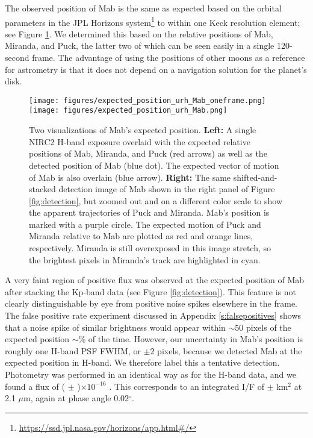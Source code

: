 \documentclass[preprint]{aastex631}
\begin{document}
The observed position of Mab is the same as expected based on the orbital parameters in the JPL Horizons system\footnote{\url{https://ssd.jpl.nasa.gov/horizons/app.html\#/}} to within one Keck resolution element; see Figure \ref{fig:astrometry}. We determined this based on the relative positions of Mab, Miranda, and Puck, the latter two of which can be seen easily in a single 120-second frame. The advantage of using the positions of other moons as a reference for astrometry is that it does not depend on a navigation solution for the planet's disk.

\begin{figure}
\texttt{[image: figures/expected\_position\_urh\_Mab\_oneframe.png]}
\texttt{[image: figures/expected\_position\_urh\_Mab.png]}
\caption{Two visualizations of Mab's expected position. \textbf{Left:} A single NIRC2 H-band exposure overlaid with the expected relative positions of Mab, Miranda, and Puck (red arrows) as well as the detected position of Mab (blue dot). The expected vector of motion of Mab is also overlain (blue arrow). \textbf{Right:} The same shifted-and-stacked detection image of Mab shown in the right panel of Figure \ref{fig:detection}, but zoomed out and on a different color scale to show the apparent trajectories of Puck and Miranda. Mab's position is marked with a purple circle. The expected motion of Puck and Miranda relative to Mab are plotted as red and orange lines, respectively. Miranda is still overexposed in this image stretch, so the brightest pixels in Miranda's track are highlighted in cyan.}
\label{fig:astrometry}
\end{figure}

A very faint region of positive flux was observed at the expected position of Mab after stacking the Kp-band data (see Figure \ref{fig:detection}). This feature is not clearly distinguishable by eye from positive noise spikes elsewhere in the frame. The false positive rate experiment discussed in Appendix \ref{s:falsepositives} shows that a noise spike of similar brightness would appear within $\sim$50 pixels of the expected position $\sim$\% of the time. However, our uncertainty in Mab's position is roughly one H-band PSF FWHM, or $\pm 2$ pixels, because we detected Mab at the expected position in H-band. We therefore label this a tentative detection. Photometry was performed in an identical way as for the H-band data, and we found a flux of 
( $\pm$ )$\times10^{-16}$ \ergsec{} 
. This corresponds to an integrated I/F of 
 $\pm$  km$^{2}$ 
at 2.1 $\mu$m, again at phase angle 0.02$^\circ$.
\end{document}
